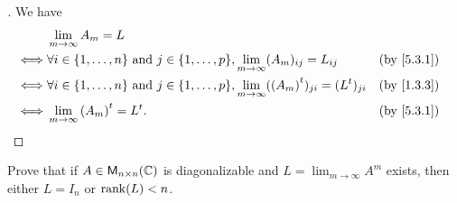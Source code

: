 \begin{proof}[]
  We have
  \begin{align*}
         & \lim_{m \to \infty} A_m = L                                                                                                                                 \\
    \iff & \forall i \in \set{1, \dots, n} \text{ and } j \in \set{1, \dots, p}, \lim_{m \to \infty} (A_m)_{i j} = L_{i j}               &  & \text{(by \cref{5.3.1})} \\
    \iff & \forall i \in \set{1, \dots, n} \text{ and } j \in \set{1, \dots, p}, \lim_{m \to \infty} (\tp{(A_m)})_{j i} = (\tp{L})_{j i} &  & \text{(by \cref{1.3.3})} \\
    \iff & \lim_{m \to \infty} \tp{(A_m)} = \tp{L}.                                                                                      &  & \text{(by \cref{5.3.1})}
  \end{align*}
\end{proof}

\begin{ex}\label{ex:5.3.4}
  Prove that if \(A \in \mathsf{M}_{{n} \times n}({\mathbb{C}})\) is diagonalizable and \(L = \lim_{m \to \infty} A^m\) exists, then either \(L = I_n\) or \(\rk{L} < n\).
\end{ex}

